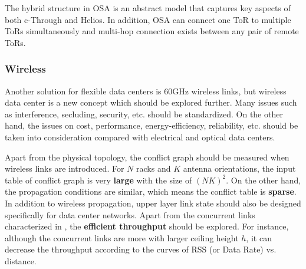\documentclass[journal,onecolumn,11pt]{IEEEtran}
\begin{document}

The hybrid structure in OSA is an abstract model that captures key aspects of both c-Through and Helios. In addition, OSA can connect one ToR to multiple ToRs simultaneously and multi-hop connection exists between any pair of remote ToRs.

\subsubsection{Wireless}

Another solution for flexible data centers is 60GHz wireless links, but wireless data center is a new concept which should be explored further. Many issues such as interference, secluding, security, etc. should be standardized. On the other hand, the issues on cost, performance, energy-efficiency, reliability, etc. should be taken into consideration compared with electrical and optical data centers.



Apart from the physical topology, the conflict graph should be measured when wireless links are introduced. For $N$ racks and $K$ antenna orientations, the input table of conflict graph is very \textbf{large} with the size of $(NK)^2$. On the other hand, the propagation conditions are similar, which means the conflict table is \textbf{sparse}. In addition to wireless propagation, upper layer link state should also be designed specifically for data center networks. Apart from the concurrent links characterized in \cite{Zhou:2012:MMC:2342356.2342440}, the \textbf{efficient throughput} should be explored. For instance, although the concurrent links are more with larger ceiling height $h$, it can decrease the throughput according to the curves of RSS (or Data Rate) vs. distance.
\end{document}
